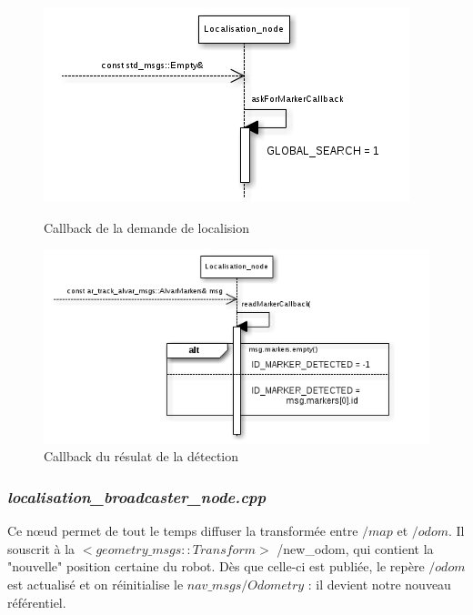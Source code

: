 \documentclass[10pt,a4paper]{article}
\begin{document}
\begin{figure}
 \begin{minipage}[b]{.48\linewidth}
\includegraphics[scale=0.5]{figures/locacbask.png} 
  \caption{Callback de la demande de localision}
 \end{minipage} \hfill
 \begin{minipage}[b]{.46\linewidth}
\includegraphics[scale=0.5]{figures/locacb2read.png} 
  \caption{Callback du résulat de la détection}
 \end{minipage}
\end{figure}
\subsubsection{\textit{localisation\_broadcaster\_node.cpp}}

Ce nœud permet de tout le temps diffuser la transformée entre $/map$ et $/odom$. Il souscrit à la $<geometry\_msgs::Transform>$ /new\_odom, qui contient la "nouvelle" position certaine du robot. Dès que celle-ci est publiée, le repère $/odom$ est actualisé et on réinitialise le $nav\_msgs/Odometry$ : il devient notre nouveau référentiel.
\end{document}
